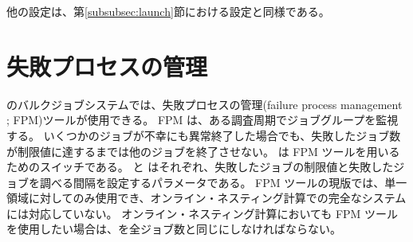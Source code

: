他の設定は、第\ref{subsubsec:launch}節における設定と同様である。



\section{失敗プロセスの管理}
\scalerm のバルクジョブシステムでは、失敗プロセスの管理(failure process management ; FPM)ツールが使用できる。
FPM は、ある調査周期でジョブグループを監視する。
いくつかのジョブが不幸にも異常終了した場合でも、失敗したジョブ数が制限値に達するまでは他のジョブを終了させない。
 は FPM ツールを用いるためのスイッチである。
 と  はそれぞれ、失敗したジョブの制限値と失敗したジョブを調べる間隔を設定するパラメータである。
FPM ツールの現版では、単一領域に対してのみ使用でき、オンライン・ネスティング計算での完全なシステムには対応していない。
オンライン・ネスティング計算においても FPM ツールを使用したい場合は、を全ジョブ数と同じにしなければならない。


